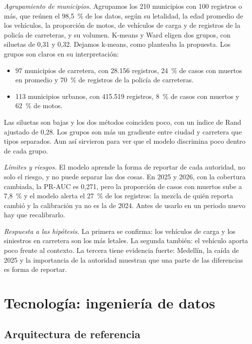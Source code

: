 \documentclass[11pt,a4paper]{article}
\begin{document}
\textit{Agrupamiento de municipios.} Agrupamos los 210 municipios con 100 registros o más, que reúnen el 98,5~\% de los datos, según su letalidad, la edad promedio de los vehículos, la proporción de motos, de vehículos de carga y de registros de la policía de carreteras, y su volumen. K-means y Ward eligen dos grupos, con siluetas de 0,31 y 0,32. Dejamos k-means, como planteaba la propuesta. Los grupos son claros en su interpretación:

\begin{itemize}
  \item 97 municipios de carretera, con 28.156 registros, 24~\% de casos con muertos en promedio y 70~\% de registros de la policía de carreteras.
  \item 113 municipios urbanos, con 415.519 registros, 8~\% de casos con muertos y 62~\% de motos.
\end{itemize}

Las siluetas son bajas y los dos métodos coinciden poco, con un índice de Rand ajustado de 0,28. Los grupos son más un gradiente entre ciudad y carretera que tipos separados. Aun así sirvieron para ver que el modelo discrimina poco dentro de cada grupo.

\textit{Límites y riesgos.} El modelo aprende la forma de reportar de cada autoridad, no solo el riesgo, y no puede separar las dos cosas. En 2025 y 2026, con la cobertura cambiada, la PR-AUC es 0,271, pero la proporción de casos con muertos sube a 7,8~\% y el modelo alerta el 27~\% de los registros: la mezcla de quién reporta cambió y la calibración ya no es la de 2024. Antes de usarlo en un periodo nuevo hay que recalibrarlo.

\textit{Respuesta a las hipótesis.} La primera se confirma: los vehículos de carga y los siniestros en carretera son los más letales. La segunda también: el vehículo aporta poco frente al contexto. La tercera tiene evidencia fuerte: Medellín, la caída de 2025 y la importancia de la autoridad muestran que una parte de las diferencias es forma de reportar.

\section{Tecnología: ingeniería de datos}\label{sec:tecnologia}

\subsection{Arquitectura de referencia}
\end{document}
